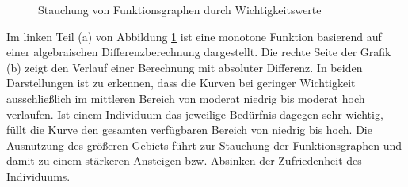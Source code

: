 \begin{figure}[h]
	\centering
	
	
	\caption{Stauchung von Funktionsgraphen durch Wichtigkeitswerte \cite[S. 1305]{locke:1976}}
	\label{fig:personEnvironmentFit:wichtigkeiten:abb1}
\end{figure}

Im linken Teil (a) von Abbildung \ref{fig:personEnvironmentFit:wichtigkeiten:abb1} ist eine monotone Funktion basierend auf einer algebraischen Differenzberechnung dargestellt. Die rechte Seite der Grafik (b) zeigt den Verlauf einer Berechnung mit absoluter Differenz. In beiden Darstellungen ist zu erkennen, dass die Kurven bei geringer Wichtigkeit ausschließlich im mittleren Bereich von moderat niedrig bis moderat hoch verlaufen. Ist einem Individuum das jeweilige Bedürfnis dagegen sehr wichtig, füllt die Kurve den gesamten verfügbaren Bereich von niedrig bis hoch. Die Ausnutzung des größeren Gebiets führt zur Stauchung der Funktionsgraphen und damit zu einem stärkeren Ansteigen bzw. Absinken der Zufriedenheit des Individuums. 

